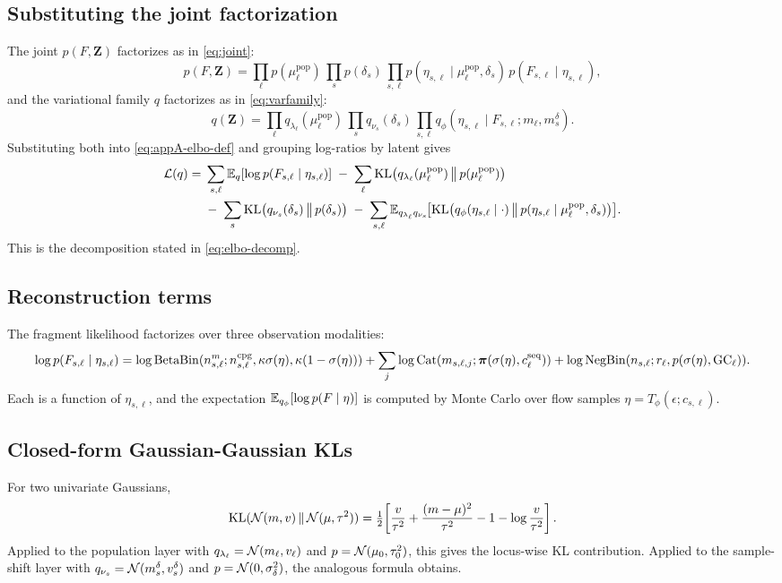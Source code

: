 \subsection*{Substituting the joint factorization}
The joint $p(F,\bm Z)$ factorizes as in \eqref{eq:joint}:
\begin{equation}
p(F,\bm Z) = \prod_\ell p(\mu^{\mathrm{pop}}_\ell)\,\prod_s p(\delta_s)\,\prod_{s,\ell} p(\eta_{s,\ell}\mid \mu^{\mathrm{pop}}_\ell,\delta_s)\,p(F_{s,\ell}\mid\eta_{s,\ell}),
\end{equation}
and the variational family $q$ factorizes as in \eqref{eq:varfamily}:
\begin{equation}
q(\bm Z) = \prod_\ell q_{\lambda_\ell}(\mu^{\mathrm{pop}}_\ell)\,\prod_s q_{\nu_s}(\delta_s)\,\prod_{s,\ell} q_\phi(\eta_{s,\ell}\mid F_{s,\ell};m_\ell,m_s^\delta).
\end{equation}
Substituting both into \eqref{eq:appA-elbo-def} and grouping log-ratios by latent gives
\begin{align}
\mathcal{L}(q) =\;& \sum_{s,\ell}\mathbb{E}_q[\log p(F_{s,\ell}\mid \eta_{s,\ell})]
\;-\;\sum_\ell \mathrm{KL}\big(q_{\lambda_\ell}(\mu^{\mathrm{pop}}_\ell)\,\big\|\,p(\mu^{\mathrm{pop}}_\ell)\big) \nonumber\\
&-\;\sum_s \mathrm{KL}\big(q_{\nu_s}(\delta_s)\,\big\|\,p(\delta_s)\big)
\;-\;\sum_{s,\ell}\mathbb{E}_{q_{\lambda_\ell} q_{\nu_s}}\!\big[\mathrm{KL}\big(q_\phi(\eta_{s,\ell}\mid \cdot)\,\big\|\,p(\eta_{s,\ell}\mid\mu^{\mathrm{pop}}_\ell,\delta_s)\big)\big].
\label{eq:appA-decomp}
\end{align}
This is the decomposition stated in \eqref{eq:elbo-decomp}.

\subsection*{Reconstruction terms}
The fragment likelihood factorizes over three observation modalities:
\begin{equation}
\log p(F_{s,\ell}\mid\eta_{s,\ell}) = \log\mathrm{BetaBin}(n^m_{s,\ell};n^{\mathrm{cpg}}_{s,\ell},\kappa\sigma(\eta),\kappa(1-\sigma(\eta))) + \sum_j \log\mathrm{Cat}(m_{s,\ell,j};\boldsymbol{\pi}(\sigma(\eta),c^{\mathrm{seq}}_\ell)) + \log\mathrm{NegBin}(n_{s,\ell};r_\ell,p(\sigma(\eta),\mathrm{GC}_\ell)).
\end{equation}
Each is a function of $\eta_{s,\ell}$, and the expectation $\mathbb{E}_{q_\phi}[\log p(F\mid\eta)]$ is computed by Monte Carlo over flow samples $\eta=T_\phi(\epsilon;c_{s,\ell})$.

\subsection*{Closed-form Gaussian-Gaussian KLs}
For two univariate Gaussians,
\begin{equation}
\mathrm{KL}(\mathcal{N}(m,v)\,\|\,\mathcal{N}(\mu,\tau^2)) = \tfrac{1}{2}\!\left[\frac{v}{\tau^2} + \frac{(m-\mu)^2}{\tau^2} - 1 - \log\frac{v}{\tau^2}\right].
\label{eq:appA-gauss-kl}
\end{equation}
Applied to the population layer with $q_{\lambda_\ell}=\mathcal{N}(m_\ell,v_\ell)$ and $p=\mathcal{N}(\mu_0,\tau_0^2)$, this gives the locus-wise KL contribution. Applied to the sample-shift layer with $q_{\nu_s}=\mathcal{N}(m_s^\delta,v_s^\delta)$ and $p=\mathcal{N}(0,\sigma_\delta^2)$, the analogous formula obtains.

